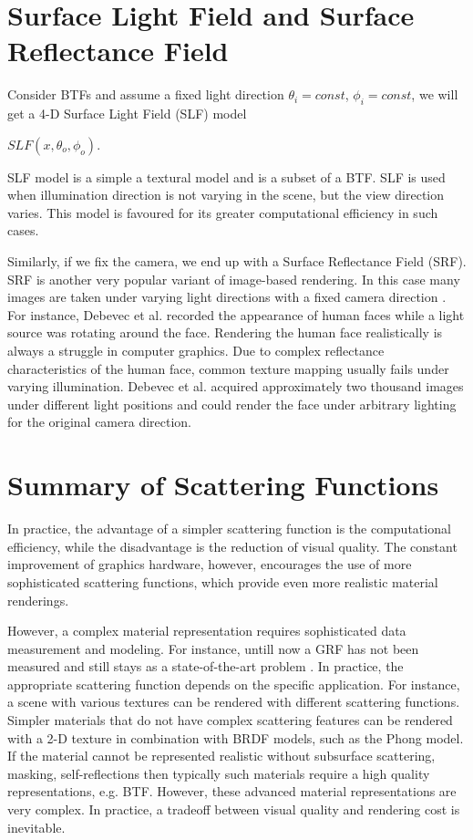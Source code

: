  
\section{Surface Light Field and Surface Reflectance Field}
\label{section:slf}
Consider BTFs and assume a fixed light direction $\theta_{i} = const$, $\phi_{i}=const$, we will get a 4-D Surface Light Field (SLF) model 


 \begin{center}
$SLF(x,\theta_{o} ,\phi_{o})$.
 \end{center}
 
 SLF model is a simple a textural model and is a subset of a BTF. 
 SLF is used when illumination direction is not varying in the scene, but the view direction varies.
This model is favoured for its greater computational efficiency in such cases.


Similarly, if we fix the camera, we end up with a Surface Reflectance Field (SRF).
 SRF is another very popular variant of image-based rendering. 
 In this case many images are taken under varying light directions with a fixed camera direction \cite{star2004}. 
 For instance, Debevec et al. \cite{debevec} recorded the appearance of human faces while a
light source was rotating around the face. Rendering the human face realistically is always a struggle in computer graphics.
Due to complex reflectance characteristics of the human face, common texture mapping usually fails under varying illumination.
 Debevec et al. acquired approximately two thousand images under different light positions and could render the face under arbitrary lighting for the original camera direction. 


\section{Summary of Scattering Functions}
\label{section:attrib}
In practice, the advantage of a simpler scattering function is the computational efficiency, 
while the disadvantage is the reduction of visual quality. 
The constant improvement of graphics hardware, however, encourages the use of more sophisticated scattering functions, which provide even more realistic material renderings. 
 
However, a complex material representation requires sophisticated data measurement and modeling.
For instance, untill now a GRF has not been measured and still stays as a state-of-the-art problem \cite{haindl_visual}.
In practice, the appropriate scattering function depends on the specific application.
For instance, a scene with various textures can be rendered with different scattering functions. 
Simpler materials that do not have complex scattering features can be rendered with a 2-D texture in combination with BRDF models, such as the Phong model.
If the material cannot be represented realistic without subsurface scattering, masking, self-reflections then typically such materials require a high quality representations, e.g. BTF.
However, these advanced material representations are very complex.
In practice, a tradeoff between visual quality and rendering cost is inevitable. 




